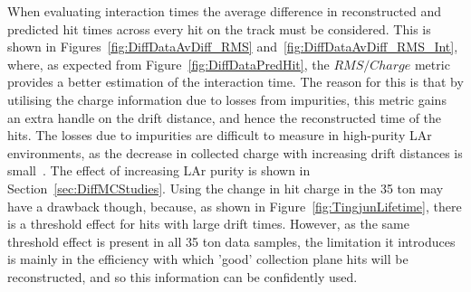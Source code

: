 When evaluating interaction times the average difference in reconstructed and predicted hit times across every hit on the track must be considered. This is shown in Figures~\ref{fig:DiffDataAvDiff_RMS} and~\ref{fig:DiffDataAvDiff_RMS_Int}, where, as expected from Figure~\ref{fig:DiffDataPredHit}, the $RMS/Charge$ metric provides a better estimation of the interaction time. The reason for this is that by utilising the charge information due to losses from impurities, this metric gains an extra handle on the drift distance, and hence the reconstructed time of the hits. The losses due to impurities are difficult to measure in high-purity LAr environments, as the decrease in collected charge with increasing drift distances is small~\citep{LongBo}. The effect of increasing LAr purity is shown in Section~\ref{sec:DiffMCStudies}. Using the change in hit charge in the 35 ton may have a drawback though, because, as shown in Figure~\ref{fig:TingjunLifetime}, there is a threshold effect for hits with large drift times. However, as the same threshold effect is present in all 35 ton data samples, the limitation it introduces is mainly in the efficiency with which 'good' collection plane hits will be reconstructed, and so this information can be confidently used. \\

